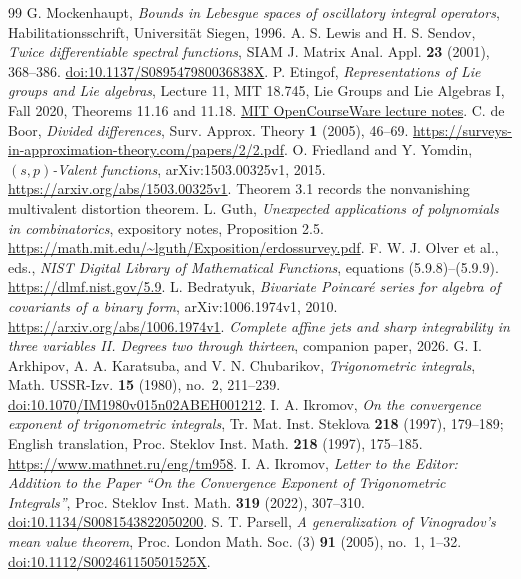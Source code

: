 \documentclass[11pt]{amsart}
\theoremstyle{definition}
\theoremstyle{remark}
\numberwithin{equation}{section}
\begin{document}
\begin{thebibliography}{99}
 G. Mockenhaupt, \emph{Bounds in Lebesgue spaces of oscillatory integral operators}, Habilitationsschrift, Universit\"at Siegen, 1996.
 A. S. Lewis and H. S. Sendov, \emph{Twice differentiable spectral functions}, SIAM J. Matrix Anal. Appl. \textbf{23} (2001), 368--386. \href{https://doi.org/10.1137/S089547980036838X}{doi:10.1137/S089547980036838X}.
 P. Etingof, \emph{Representations of Lie groups and Lie algebras}, Lecture 11, MIT 18.745, Lie Groups and Lie Algebras I, Fall 2020, Theorems 11.16 and 11.18. \href{https://ocw.mit.edu/courses/18-745-lie-groups-and-lie-algebras-i-fall-2020/mit18_745_f20_lec11.pdf}{MIT OpenCourseWare lecture notes}.
 C. de Boor, \emph{Divided differences}, Surv. Approx. Theory \textbf{1} (2005), 46--69. \url{https://surveys-in-approximation-theory.com/papers/2/2.pdf}.
 O. Friedland and Y. Yomdin, \emph{$(s,p)$-Valent functions}, arXiv:1503.00325v1, 2015. \url{https://arxiv.org/abs/1503.00325v1}. Theorem 3.1 records the nonvanishing multivalent distortion theorem.
 L. Guth, \emph{Unexpected applications of polynomials in combinatorics}, expository notes, Proposition 2.5. \url{https://math.mit.edu/~lguth/Exposition/erdossurvey.pdf}.
 F. W. J. Olver et al., eds., \emph{NIST Digital Library of Mathematical Functions}, equations (5.9.8)--(5.9.9). \url{https://dlmf.nist.gov/5.9}.
 L. Bedratyuk, \emph{Bivariate Poincar\'e series for algebra of covariants of a binary form}, arXiv:1006.1974v1, 2010. \url{https://arxiv.org/abs/1006.1974v1}.
 \emph{Complete affine jets and sharp integrability in three variables II. Degrees two through thirteen}, companion paper, 2026.
 G. I. Arkhipov, A. A. Karatsuba, and V. N. Chubarikov, \emph{Trigonometric integrals}, Math. USSR-Izv. \textbf{15} (1980), no.~2, 211--239. \href{https://doi.org/10.1070/IM1980v015n02ABEH001212}{doi:10.1070/IM1980v015n02ABEH001212}.
 I. A. Ikromov, \emph{On the convergence exponent of trigonometric integrals}, Tr. Mat. Inst. Steklova \textbf{218} (1997), 179--189; English translation, Proc. Steklov Inst. Math. \textbf{218} (1997), 175--185. \url{https://www.mathnet.ru/eng/tm958}.
 I. A. Ikromov, \emph{Letter to the Editor: Addition to the Paper ``On the Convergence Exponent of Trigonometric Integrals''}, Proc. Steklov Inst. Math. \textbf{319} (2022), 307--310. \href{https://doi.org/10.1134/S0081543822050200}{doi:10.1134/S0081543822050200}.
 S. T. Parsell, \emph{A generalization of Vinogradov's mean value theorem}, Proc. London Math. Soc. (3) \textbf{91} (2005), no.~1, 1--32. \href{https://doi.org/10.1112/S002461150501525X}{doi:10.1112/S002461150501525X}.

\end{thebibliography}
\end{document}
